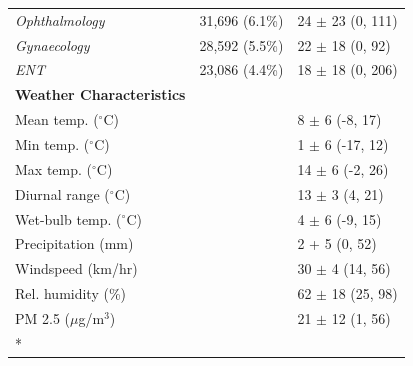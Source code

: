 \begin{longtable}[t]{lll}
\hspace{2em}\textit{Ophthalmology} & 31,696 (6.1\%) & 24 $\pm$ 23 (0, 111)\\
\hspace{2em}\textit{Gynaecology} & 28,592 (5.5\%) & 22 $\pm$ 18 (0, 92)\\
\hspace{2em}\textit{ENT} & 23,086 (4.4\%) & 18 $\pm$ 18 (0, 206)\\
\textbf{Weather Characteristics} &  & \\
\hspace{1em}Mean temp. ($^\circ$C) &  & 8 $\pm$ 6 (-8, 17)\\
\hspace{1em}Min temp. ($^\circ$C) &  & 1 $\pm$ 6 (-17, 12)\\
\hspace{1em}Max temp. ($^\circ$C) &  & 14 $\pm$ 6 (-2, 26)\\
\hspace{1em}Diurnal range ($^\circ$C) &  & 13 $\pm$ 3 (4, 21)\\
\hspace{1em}Wet-bulb temp. ($^\circ$C) &  & 4 $\pm$ 6 (-9, 15)\\
\hspace{1em}Precipitation (mm) &  & 2 + 5 (0, 52)\\
\hspace{1em}Windspeed (km/hr) &  & 30 $\pm$ 4 (14, 56)\\
\hspace{1em}Rel. humidity (\%) &  & 62 $\pm$ 18 (25, 98)\\
\hspace{1em}PM 2.5 ($\mu$g/m$^{3}$) &  & 21 $\pm$ 12 (1, 56)\\*
\end{longtable}
\endgroup{}
